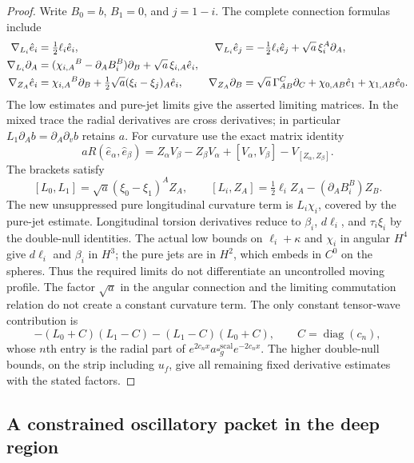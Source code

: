 \begin{proof}
Write $B_0=b$, $B_1=0$, and $j=1-i$.
The complete connection formulas include
\begin{align}
 \nabla_{L_i}\hat e_i&=\tfrac12\ell_i\hat e_i,&
 \nabla_{L_i}\hat e_j&=-\tfrac12\ell_i\hat e_j
                         +\sqrt a\,\xi_i^A\partial_A,
 \label{pk2:radial-connection}\\
 \nabla_{L_i}\partial_A
   &=(\chi_{i,A}{}^B-\partial_AB_i^B)\partial_B
                         +\sqrt a\,\xi_{i,A}\hat e_i,
 \notag\\
 \nabla_{Z_A}\hat e_i
   &=\chi_{i,A}{}^B\partial_B
      +\tfrac12\sqrt a(\xi_i-\xi_j)_A\hat e_i,&
 \nabla_{Z_A}\partial_B
   &=\sqrt a\,\Gamma_{AB}^C\partial_C
           +\chi_{0,AB}\hat e_1+\chi_{1,AB}\hat e_0.
 \notag
\end{align}
The low estimates and pure-jet limits give the asserted limiting
matrices. In the mixed trace the radial derivatives are cross
derivatives; in particular
$L_1\partial_Ab=\partial_A\partial_vb$ retains $a$.
For curvature use the exact matrix identity
\[
 aR(\hat e_\alpha,\hat e_\beta)
 =Z_\alpha V_\beta-Z_\beta V_\alpha
      +[V_\alpha,V_\beta]-V_{[Z_\alpha,Z_\beta]}.
\]
The brackets satisfy
\[
 [L_0,L_1]=\sqrt a(\xi_0-\xi_1)^AZ_A,
 \qquad
 [L_i,Z_A]=\tfrac12\ell_iZ_A-(\partial_AB_i^B)Z_B.
\]
The new unsuppressed pure longitudinal curvature term is
$L_i\chi_i$, covered by the pure-jet estimate. Longitudinal torsion
derivatives reduce to $\beta_i$, $d\ell_i$, and $\tau_i\xi_i$ by
the double-null identities. The actual low bounds on
$\ell_i+\kappa$ and $\chi_i$ in angular $H^4$ give $d\ell_i$ and
$\beta_i$ in $H^3$; the pure jets are in $H^2$, which embeds in
$C^0$ on the spheres. Thus the required limits do not differentiate
an uncontrolled moving profile. The factor $\sqrt a$ in the angular
connection and the limiting commutation relation do not create a
constant curvature term. The only constant tensor-wave contribution
is
\[
 -(L_0+C)(L_1-C)-(L_1-C)(L_0+C),
 \qquad C=\operatorname{diag}(c_n),
\]
whose $n$th entry is the radial part of
$e^{2c_nx}a\square_g^{\mathrm{scal}}e^{-2c_nx}$.
The higher double-null bounds, on the strip including $u_f$, give
all remaining fixed derivative estimates with the stated factors.
\end{proof}

\subsection{A constrained oscillatory packet in the deep region}
\label{pk2:deep-packet}

